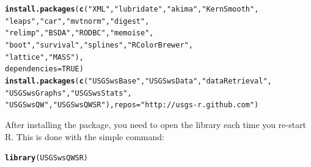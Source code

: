 \documentclass[a4paper,11pt]{article}\usepackage[]{graphicx}\usepackage[]{color}
\makeatletter
\newcommand{\hlnum}[1]{\textcolor[rgb]{0.686,0.059,0.569}{#1}}%
\newcommand{\hlstr}[1]{\textcolor[rgb]{0.192,0.494,0.8}{#1}}%
\newcommand{\hlstd}[1]{\textcolor[rgb]{0.345,0.345,0.345}{#1}}%
\newcommand{\hlkwc}[1]{\textcolor[rgb]{0.333,0.667,0.333}{#1}}%
\newcommand{\hlkwd}[1]{\textcolor[rgb]{0.737,0.353,0.396}{\textbf{#1}}}%
\newenvironment{kframe}{%
 \def\at@end@of@kframe{}%
 \ifinner\ifhmode%
  \def\at@end@of@kframe{\end{minipage}}%
  \begin{minipage}{\columnwidth}%
 \fi\fi%
 \def\FrameCommand##1{\hskip\@totalleftmargin \hskip-\fboxsep
 \colorbox{shadecolor}{##1}\hskip-\fboxsep
     \hskip-\linewidth \hskip-\@totalleftmargin \hskip\columnwidth}%
 \MakeFramed {\advance\hsize-\width
   \@totalleftmargin\z@ \linewidth\hsize
   \@setminipage}}%
 {\par\unskip\endMakeFramed%
 \at@end@of@kframe}
\newenvironment{knitrout}{}{} %
\makeatother
\begin{document}
\begin{knitrout}
\color{fgcolor}\begin{kframe}
\begin{alltt}
\hlkwd{install.packages}\hlstd{(}\hlkwd{c}\hlstd{(}\hlstr{"XML"}\hlstd{,} \hlstr{"lubridate"}\hlstd{,} \hlstr{"akima"}\hlstd{,} \hlstr{"KernSmooth"}\hlstd{,}
                   \hlstr{"leaps"}\hlstd{,} \hlstr{"car"}\hlstd{,} \hlstr{"mvtnorm"}\hlstd{,} \hlstr{"digest"}\hlstd{,}
                   \hlstr{"relimp"}\hlstd{,} \hlstr{"BSDA"}\hlstd{,} \hlstr{"RODBC"}\hlstd{,}\hlstr{"memoise"}\hlstd{,}
                   \hlstr{"boot"}\hlstd{,}\hlstr{"survival"}\hlstd{,}\hlstr{"splines"}\hlstd{,}\hlstr{"RColorBrewer"}\hlstd{,}
                   \hlstr{"lattice"}\hlstd{,}\hlstr{"MASS"}\hlstd{),}
                 \hlkwc{dependencies}\hlstd{=}\hlnum{TRUE}\hlstd{)}
\hlkwd{install.packages}\hlstd{(}\hlkwd{c}\hlstd{(}\hlstr{"USGSwsBase"}\hlstd{,}\hlstr{"USGSwsData"}\hlstd{,}\hlstr{"dataRetrieval"}\hlstd{,}
                   \hlstr{"USGSwsGraphs"}\hlstd{,}\hlstr{"USGSwsStats"}\hlstd{,}
                   \hlstr{"USGSwsQW"}\hlstd{,}\hlstr{"USGSwsQWSR"}\hlstd{),} \hlkwc{repos}\hlstd{=}\hlstr{"http://usgs-r.github.com"}\hlstd{)}
\end{alltt}
\end{kframe}
\end{knitrout}



After installing the package, you need to open the library each time you re-start R.  This is done with the simple command:
\begin{knitrout}
\color{fgcolor}\begin{kframe}
\begin{alltt}
\hlkwd{library}\hlstd{(USGSwsQWSR)}
\end{alltt}
\end{kframe}
\end{knitrout}
\end{document}
